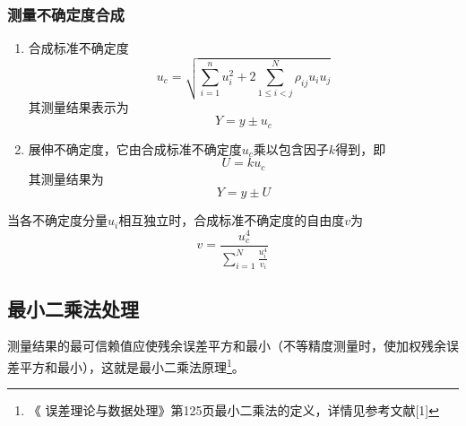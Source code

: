 \subsubsection{测量不确定度合成}
\begin{enumerate}
	\item 合成标准不确定度\[ u_c=\sqrt{\sum_{i=1}^{n}u_i^2+2\sum_{1\le i<j}^{N}\rho_{ij}u_iu_j} \]
	其测量结果表示为\[ Y=y\pm u_c \]
	\item 展伸不确定度，它由合成标准不确定度$ u_c $乘以包含因子$ k $得到，即\[ U=ku_c \]
	其测量结果为\[ Y=y\pm U \]
\end{enumerate}
当各不确定度分量$ u_i $相互独立时，合成标准不确定度的自由度$ v $为\[ v=\frac{u_c^4}{\sum\limits_{i=1}^{N}\frac{u_i^4}{v_i}} \]
\subsection{最小二乘法处理}
测量结果的最可信赖值应使残余误差平方和最小（不等精度测量时，使加权残余误差平方和最小），这就是最小二乘法原理\footnote{《
	误差理论与数据处理》第125页最小二乘法的定义，详情见参考文献[1]}。
